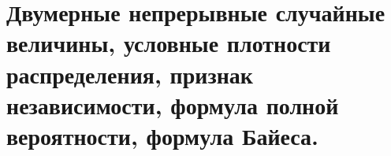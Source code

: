 \documentclass[polytech/stats/exam-2023/stats-exam-2023.tex]{subfiles}
\begin{document}
\section{Двумерные непрерывные случайные величины, условные плотности распределения, признак независимости, формула полной вероятности, формула Байеса.}
\end{document}
